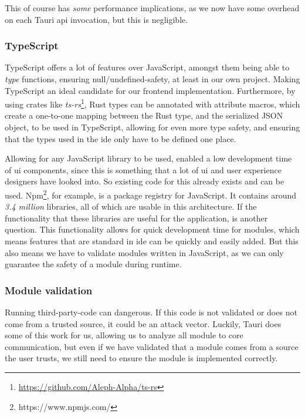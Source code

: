 This of course has \textit{some} performance implications, as we now have some overhead on
each Tauri \gls*{api} invocation, but this is negligible\footnotemark{}.



\subsubsection{TypeScript}

TypeScript offers a lot of features over JavaScript, amongst them being able to
\textit{type} functions, ensuring null/undefined-safety, at least in our own
project. Making TypeScript an ideal candidate for our frontend implementation.
Furthermore, by using crates like \textit{ts-rs}\footnote{\url{https://github.com/Aleph-Alpha/ts-rs}},
Rust types can be annotated with attribute macros, which create a one-to-one
mapping between the Rust type, and the serialized JSON object, to be used in
TypeScript, allowing for even more type safety, and ensuring that the types used
in the \gls*{ide} only have to be defined one place.

Allowing for any JavaScript library to be used, enabled a low development time
of \gls*{ui} components, since this is something that a lot of \gls*{ui} and user
experience designers have looked into. So existing code for this already exists
and can be used. Npm\footnote{https://www.npmjs.com/}, for example, is a
package registry for JavaScript. It contains around \textit{3.4 million}
libraries, all of which are usable in this architecture. If the functionality
that these libraries are useful for the application, is another question. This
functionality allows for quick development time for modules, which means
features that are standard in \gls*{ide} can be quickly and easily added. But
this also means we have to validate modules written in JavaScript, as we can
only guarantee the safety of a module during runtime.


\subsubsection{Module validation}

Running third-party-code can dangerous. If this code is not validated or does
not come from a trusted source, it could be an attack vector. Luckily, Tauri
does some of this work for us, allowing us to analyze all module to core
communication, but even if we have validated that a module comes from a source
the user trusts, we still need to ensure the module is implemented correctly.

